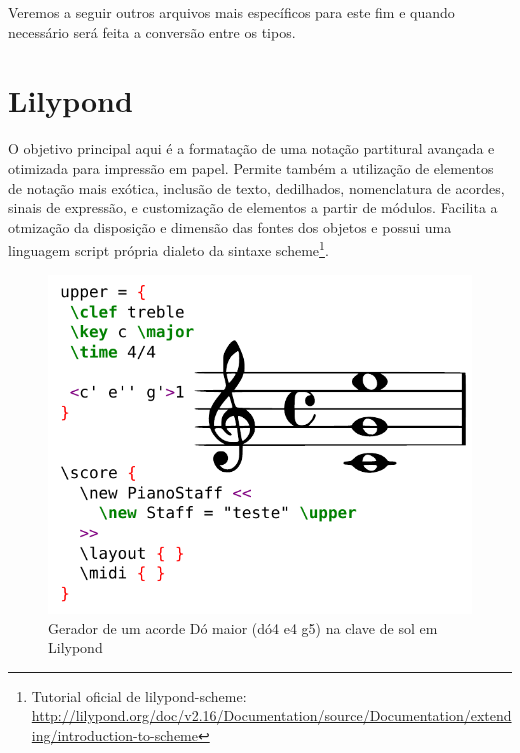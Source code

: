 \documentclass[
	12pt,				%
	openright,			%
	twoside,			%
	a4paper,			%
	english,			%
	french,				%
	spanish,			%
	brazil				%
	]{abntex2}
\begin{document}
Veremos a seguir outros arquivos mais específicos para este fim e quando necessário será feita a conversão entre os tipos.



\pagebreak

\section{Lilypond}

O objetivo principal aqui é a formatação de uma notação partitural avançada e otimizada para impressão em papel. Permite também a utilização de elementos de notação mais exótica, inclusão de texto, dedilhados, nomenclatura de acordes, sinais de expressão, e customização de elementos a partir de módulos. Facilita a otmização da disposição e dimensão das fontes dos objetos e possui uma linguagem script própria dialeto da sintaxe scheme\footnote{Tutorial oficial de lilypond-scheme: \url{http://lilypond.org/doc/v2.16/Documentation/source/Documentation/extending/introduction-to-scheme}}.



\begin{figure}[htb]
	\caption{\label{fig_grafico}Gerador de um acorde Dó maior (dó4 e4 g5) na clave de sol em Lilypond}
	\begin{center}
	    \includegraphics[scale=0.75]{score/lilypond.pdf}
	\end{center}
\end{figure}
\end{document}
